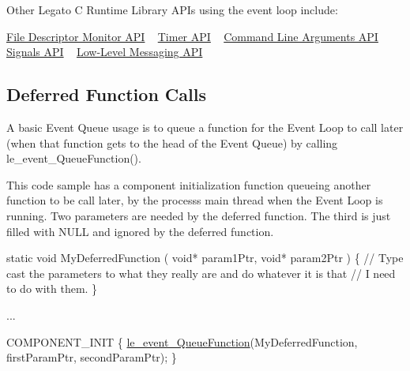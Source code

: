 Other Legato C Runtime Library A\+P\+Is using the event loop include\+:

\hyperlink{c_fdMonitor}{File Descriptor Monitor A\+P\+I} ~\newline
 \hyperlink{c_timer}{Timer A\+P\+I} ~\newline
 \hyperlink{c_args}{Command Line Arguments A\+P\+I} ~\newline
 \hyperlink{c_signals}{Signals A\+P\+I} ~\newline
 \hyperlink{c_messaging}{Low-\/\+Level Messaging A\+P\+I} ~\newline
\hypertarget{c_event_loop_c_event_deferredFunctionCalls}{}\subsection{Deferred Function Calls}\label{c_event_loop_c_event_deferredFunctionCalls}
A basic Event Queue usage is to queue a function for the Event Loop to call later (when that function gets to the head of the Event Queue) by calling l{\ttfamily e\+\_\+event\+\_\+\+Queue\+Function()}.

This code sample has a component initialization function queueing another function to be call later, by the process\textquotesingle{}s main thread when the Event Loop is running. Two parameters are needed by the deferred function. The third is just filled with N\+U\+L\+L and ignored by the deferred function.


\begin{DoxyCode}
\textcolor{keyword}{static} \textcolor{keywordtype}{void} MyDeferredFunction
(
    \textcolor{keywordtype}{void}* param1Ptr,
    \textcolor{keywordtype}{void}* param2Ptr
)
\{
    \textcolor{comment}{// Type cast the parameters to what they really are and do whatever it is that}
    \textcolor{comment}{// I need to do with them.}
\}

...

COMPONENT\_INIT
\{
    \hyperlink{le__event_loop_8h_a6dcc88f96060c5bc107a81a978132f38}{le\_event\_QueueFunction}(MyDeferredFunction, firstParamPtr, secondParamPtr);
\}
\end{DoxyCode}



